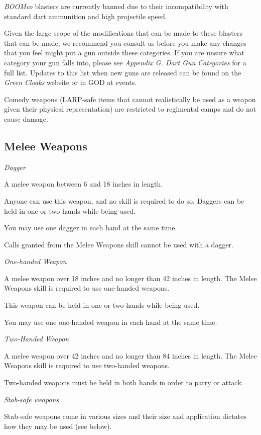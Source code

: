 \documentclass{scrbook}
\begin{document}
\textit{BOOMco} blasters are currently banned due to their incompatibility with standard dart ammunition and high projectile speed.

Given the large scope of the modifications that can be made to these blasters that can be made, we recommend you consult us before you make any changes that you feel might put a gun outside these categories. If you are unsure what category your gun falls into, please see \textit{Appendix G. Dart Gun} \textit{Categories} for a full list. Updates to this list when new guns are released can be found on the \textit{Green Cloaks} website or in GOD at events.

Comedy weapons (LARP-safe items that cannot realistically be used as a weapon given their physical representation) are restricted to regimental camps and do not cause damage.

\subsection{Melee Weapons}

\textit{Dagger}

A melee weapon between 6 and 18 inches in length.

Anyone can use this weapon, and no skill is required to do so. Daggers can be held in one or two hands while being used.

You may use one dagger in each hand at the same time.

Calls granted from the Melee Weapons skill cannot be used with a dagger.

\textit{One-handed Weapon}

A melee weapon over 18 inches and no longer than 42 inches in length. The Melee Weapons skill is required to use one-handed weapons.

This weapon can be held in one or two hands while being used.

You may use one one-handed weapon in each hand at the same time.

\textit{Two-Handed Weapon}

A melee weapon over 42 inches and no longer than 84 inches in length. The Melee Weapons skill is required to use two-handed weapons.

Two-handed weapons must be held in both hands in order to parry or attack.

\textit{Stab-safe weapons}

Stab-safe weapons come in various sizes and their size and application dictates how they may be used (see below).
\end{document}
